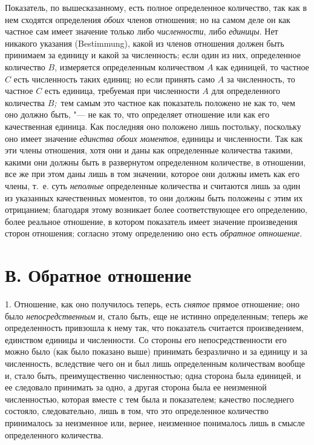 Показатель, по вышесказанному, есть полное определенное количество, так как
в нем сходятся определения {\em обоих} членов
отношения; но на самом деле он как частное сам имеет значение только либо
{\em численности}, либо
{\em единицы}. Нет никакого указания (Bestimmung),
какой из членов отношения должен быть принимаем за единицу и какой за
численность; если один из них, определенное количество
$B$, измеряется определенным количеством
$A$ как единицей, то частное
$C$ есть численность таких единиц; но если принять само
$A$ за численность, то частное
$C$ есть единица, требуемая при численности
$A$ для определенного количества
$B${\em ;\,} тем самым это частное как показатель положено
не как то, чем оно должно быть, "--- не как то, что определяет отношение или
как его качественная единица. Как последняя оно положено лишь постольку,
поскольку оно имеет значение {\em единства обоих
моментов}, единицы и численности. Так как эти члены отношения, хотя они и
даны как определенные количества такими, какими они должны быть в
развернутом определенном количестве, в отношении, все же при этом даны лишь
в том значении, которое они должны иметь как его члены, т.~е. суть
{\em неполные} определенные количества и считаются лишь
за один из указанных качественных моментов, то они должны быть положены с
этим их отрицанием; благодаря этому возникает более соответствующее его
определению, более реальное отношение, в котором показатель имеет значение
произведения сторон отношения; согласно этому определению оно есть
{\em обратное отношение}.

\section[В. Обратное отношение]{В. Обратное отношение}
1. Отношение, как оно получилось теперь, есть
{\em снятое} прямое отношение; оно было
{\em непосредственным} и, стало быть, еще не истинно
определенным; теперь же определенность привзошла к нему так, что показатель
считается произведением, единством единицы и численности. Со стороны его
непосредственности его можно было (как было показано выше) принимать
безразлично и за единицу и за численность, вследствие чего он и был лишь
определенным количествам вообще и, стало быть, преимущественно
численностью; одна сторона была единицей, и ее следовало принимать за одно,
а другая сторона была ее неизменной численностью, которая вместе с тем была
и показателем; качество последнего состояло, следовательно, лишь в том, что
это определенное количество принималось за неизменное или, вернее,
неизменное понималось лишь в смысле определенного количества.

